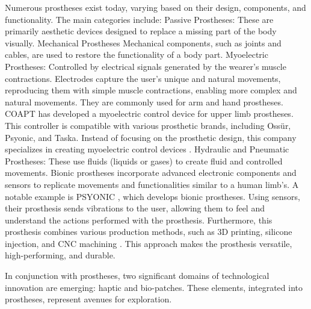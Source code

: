 Numerous prostheses exist today, varying based on their design, components, and functionality. The main categories include:
Passive Prostheses: These are primarily aesthetic devices designed to replace a missing part of the body visually.
Mechanical Prostheses Mechanical components, such as joints and cables, are used to restore the functionality of a body part.
Myoelectric Prostheses: Controlled by electrical signals generated by the wearer's muscle contractions. Electrodes capture the user's unique and natural movements, reproducing them with simple muscle contractions, enabling more complex and natural movements. They are commonly used for arm and hand prostheses. COAPT has developed a myoelectric control device for upper limb prostheses. This controller is compatible with various prosthetic brands, including Ossür, Psyonic, and Taska. Instead of focusing on the prosthetic design, this company specializes in creating myoelectric control devices \cite{noauthor_coapt_nodate}.
Hydraulic and Pneumatic Prostheses: These use fluids (liquids or gases) to create fluid and controlled movements.
Bionic prostheses incorporate advanced electronic components and sensors to replicate movements and functionalities similar to a human limb’s. A notable example is PSYONIC \cite{noauthor_psyonic_nodate}, which develops bionic prostheses. Using sensors, their prosthesis sends vibrations to the user, allowing them to feel and understand the actions performed with the prosthesis. Furthermore, this prosthesis combines various production methods, such as 3D printing, silicone injection, and CNC machining \cite{noauthor_advanced_nodate}. This approach makes the prosthesis versatile, high-performing, and durable.

In conjunction with prostheses, two significant domains of technological innovation are emerging: haptic and bio-patches. These elements, integrated into prostheses, represent avenues for exploration.

